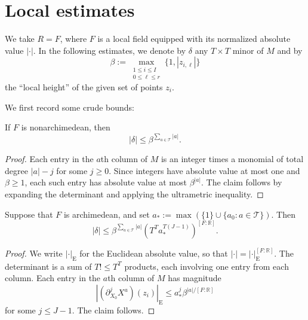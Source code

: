 \documentclass[reqno]{amsart} 
\begin{document}
\section{Local estimates}\label{section:local}

We take $R = F$, where $F$ is a local field equipped with its normalized absolute value $|\cdot|$.  In the following estimates, we denote by $\delta$ any $T \times T$ minor of $M$ and by
\begin{equation*}
  \beta := \max_{\substack{1\leq i\leq I\\0\leq\ell\leq r}}\{1, |z_{i,\ell}|\}
\end{equation*}
the ``local height'' of the given set of points $z_i$.

We first record some crude bounds:

\begin{lemma}\label{lemma:nonarch}
  If $F$ is nonarchimedean, then
  \begin{equation*}
    |\delta| \leq \beta^{\sum_{a \in \mathcal{T}}|a|}.
  \end{equation*}
\end{lemma}
\begin{proof}
  Each entry in the $a$th column of $M$ is an integer times a monomial of total degree $|a| - j$ for some $j \geq 0$.  Since integers have absolute value at most one and $\beta \geq 1$, each such entry has absolute value at most $\beta^{|a|}$.  The claim follows by expanding the determinant and applying the ultrametric inequality.
\end{proof}

\begin{lemma}\label{lemma:arch}
  Suppose that $F$ is archimedean, and set $a_* := \max(\{1\}\cup\{a_0:a\in\mathcal{T}\})$.  Then
  \begin{equation*}
    |\delta|
    \leq \beta^{\sum_{a\in\mathcal{T}}|a|}
    \left(T^T a_*^{T(J-1)}\right)^{[F:\mathbb{R}]}.
  \end{equation*}
\end{lemma}
\begin{proof}
  We write $|\cdot|_{\mathrm{E}}$ for the Euclidean absolute value, so that $|\cdot|=|\cdot|_{\mathrm{E}}^{[F:\mathbb{R}]}$.  The determinant is a sum of $T! \leq T^T$ products, each involving one entry from each column.  Each entry in the $a$th column of $M$ has magnitude
  \begin{equation*}
    |(\partial_{X_0}^j X^a)(z_i)|_{\mathrm{E}}
    \leq a_*^j\beta^{|a|/[F:\mathbb{R}]}
  \end{equation*}
  for some $j \leq J - 1$.  The claim follows.
\end{proof}
\end{document}
